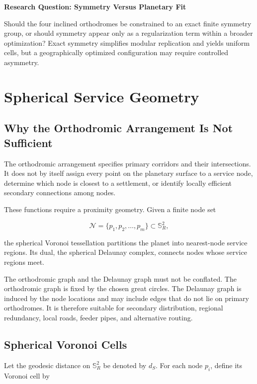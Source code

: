 \documentclass[11pt,fleqn]{book}
\numberwithin{equation}{chapter}
\newenvironment{research}[1]
  {\begin{researchEnv}
   \noindent\textbf{Research Question: #1}\par\smallskip}
  {\end{researchEnv}}
\theoremstyle{plain}
\theoremstyle{definition}
\theoremstyle{remark}
\newcommand{\Sphere}{\mathbb{S}^{2}}
\newcommand{\Nset}{\mathcal{N}}
\begin{document}
\begin{research}{Symmetry Versus Planetary Fit}
Should the four inclined orthodromes be constrained to an exact finite symmetry group, or should symmetry appear only as a regularization term within a broader optimization? Exact symmetry simplifies modular replication and yields uniform cells, but a geographically optimized configuration may require controlled asymmetry.
\end{research}

\chapter{Spherical Service Geometry}

\section{Why the Orthodromic Arrangement Is Not Sufficient}

The orthodromic arrangement specifies primary corridors and their intersections. It does not by itself assign every point on the planetary surface to a service node, determine which node is closest to a settlement, or identify locally efficient secondary connections among nodes.

These functions require a proximity geometry. Given a finite node set

\begin{equation}
    \Nset
    =
    \{p_1,p_2,\dots,p_m\}
    \subset\Sphere_R,
\end{equation}

the spherical Voronoi tessellation partitions the planet into nearest-node service regions. Its dual, the spherical Delaunay complex, connects nodes whose service regions meet.

The orthodromic graph and the Delaunay graph must not be conflated. The orthodromic graph is fixed by the chosen great circles. The Delaunay graph is induced by the node locations and may include edges that do not lie on primary orthodromes. It is therefore suitable for secondary distribution, regional redundancy, local roads, feeder pipes, and alternative routing.

\section{Spherical Voronoi Cells}

Let the geodesic distance on \(\Sphere_R\) be denoted by \(d_S\). For each node \(p_i\), define its Voronoi cell by
\end{document}

